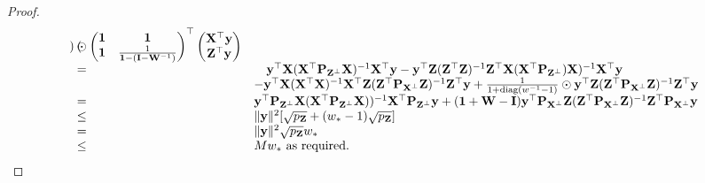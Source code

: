 \documentclass{amsart}[12pt]
\theoremstyle{definition}
\begin{document}
\begin{proof}
\begin{equation*}
\begin{array}{ll}
\begin{pmatrix}
			\end{pmatrix}
			\odot
			\begin{pmatrix}
			{\bf1}                                                                  & {\bf 1}                                                                                                                                                                                                   \\
			{\bf 1}                                                                  & \frac{1}{{\bf 1} - ({\bf I} - {\bf W}^{-1})}                                                                                                                                                                      
			\end{pmatrix}
			^\top
			\begin{pmatrix}
			{\bf X}^\top {\bf y} \\
			{\bf Z}^\top {\bf y}
			\end{pmatrix} \\
			=                                                                      & \quad{\bf y}^\top {\bf X} ({\bf X}^\top {\bf P}_{{\bf Z}^\perp} {\bf X})^{-1} {\bf X}^\top {\bf y} - {\bf y}^\top {\bf Z}({\bf Z}^\top {\bf Z})^{-1} {\bf Z}^\top {\bf X} ({\bf X}^\top {\bf P}_{{\bf Z}^\perp}) {\bf X})^{-1} {\bf X}^\top {\bf y}                                     \\
			                                                                       & -{\bf y}^\top {\bf X} ({\bf X}^\top {\bf X})^{-1} {\bf X}^\top {\bf Z} ({\bf Z}^\top {\bf P}_{{\bf X}^\perp} {\bf Z})^{-1} {\bf Z}^\top {\bf y} + \frac{1}{1 + \text{diag}{(w^{-1} - 1)}} \odot {\bf y}^\top {\bf Z} ({\bf Z}^\top {\bf P}_{{\bf X}^\perp} {\bf Z})^{-1} {\bf Z}^\top {\bf y} \\
			=                                                                      & {\bf y}^\top {\bf P}_{{\bf Z}^\perp} {\bf X} ({\bf X}^\top {\bf P}_{{\bf Z}^\perp} {\bf X}))^{-1} {\bf X}^\top {\bf P}_{{\bf Z}^\perp} {\bf y}                                                                                                          
			+ ({\bf 1} + {\bf W} - {\bf I}) {\bf y}^\top {\bf P}_{{\bf X}^\perp} {\bf Z} ({\bf Z}^\top {\bf P}_{{\bf X}^\perp} {\bf Z})^{-1} {\bf Z}^\top {\bf P}_{{\bf X}^\perp} {\bf y} \\
			\leq                                                                   & \| {\bf y} \|^2 [\sqrt{p_{\bf Z}} + (w_* - 1) \sqrt{p_{\bf Z}}]                                                                                                                                                     \\
			=                                                                      & \| {\bf y} \|^2 \sqrt{p_{\bf Z}} w_*                                                                                                                                                                            \\
			\leq                                                                   & M w_* \text{ as required}.                                                                                                                                                                              
		\end{array}
	\end{equation*}
		 
\end{proof}
\end{document}
